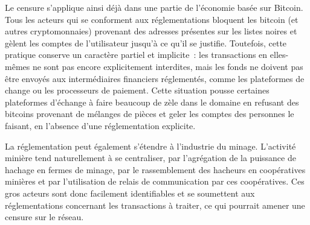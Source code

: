 Le censure s'applique ainsi déjà dans une partie de l'économie basée sur Bitcoin. Tous les acteurs qui se conforment aux réglementations bloquent les bitcoin (et autres cryptomonnaies) provenant des adresses présentes sur les listes noires et gèlent les comptes de l'utilisateur jusqu'à ce qu'il se justifie. Toutefois, cette pratique conserve un caractère partiel et implicite~: les transactions en elles-mêmes ne sont pas encore explicitement interdites, mais les fonds ne doivent pas être envoyés aux intermédiaires financiers réglementés, comme les plateformes de change ou les processeurs de paiement. Cette situation pousse certaines plateformes d'échange à faire beaucoup de zèle dans le domaine en refusant des bitcoins provenant de mélanges de pièces et geler les comptes des personnes le faisant, en l'absence d'une réglementation explicite.

La réglementation peut également s'étendre à l'industrie du minage. L'activité minière tend naturellement à se centraliser, par l'agrégation de la puissance de hachage en fermes de minage, par le rassemblement des hacheurs en coopératives minières et par l'utilisation de relais de communication par ces coopératives. Ces gros acteurs sont donc facilement identifiables et se soumettent aux réglementations concernant les transactions à traiter, ce qui pourrait amener une censure sur le réseau.

